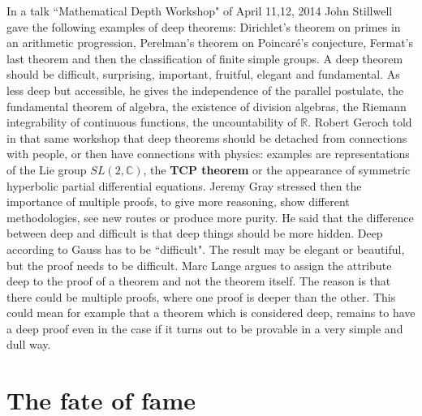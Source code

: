 \documentclass[12pt]{amsart}
\newcounter{example}    \def\example#1{ \item \fontsize{12}{15} \selectfont #1 \fontsize{12}{15} \selectfont }
\begin{document}
In a talk ``Mathematical Depth Workshop" of April 11,12, 2014 John Stillwell gave the following
examples of deep theorems: Dirichlet's theorem on primes in an arithmetic progression,
Perelman's theorem on Poincar\'e's conjecture, Fermat's last theorem and then
the classification of finite simple groups. A deep theorem should be
difficult, surprising, important, fruitful, elegant and fundamental.
As less deep but accessible, he gives the independence of the 
parallel postulate, the fundamental theorem of algebra,
the existence of division algebras, the Riemann integrability of continuous functions, the uncountability
of $\mathbb{R}$.  Robert Geroch told in that same workshop that deep theorems
should be detached from connections with people, or then have connections with physics:
examples are representations of the Lie group $SL(2,\mathbb{C})$,
the {\bf TCP theorem} or the appearance of symmetric hyperbolic partial differential equations.
Jeremy Gray stressed then the importance of multiple proofs, to give more
reasoning, show different methodologies, see new routes or produce more purity.
He said that the difference between deep and difficult is that deep things should be more hidden.
Deep according to Gauss has to be ``difficult". The result may be elegant or beautiful,
but the proof needs to be difficult.
Marc Lange \cite{Lange2014} argues to assign the attribute deep to the proof of a theorem and not
the theorem itself. The reason is that there could be multiple proofs, where one proof is deeper 
than the other. This could mean for example that a theorem which is considered deep, remains to have
a deep proof even in the case if it turns out to be provable in a very simple and dull way. 

\section*{The fate of fame} 
\end{document}
